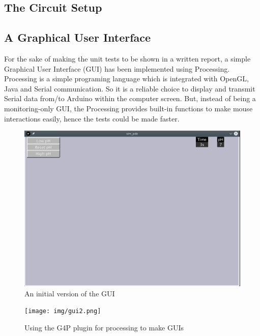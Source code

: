 
\subsection{The Circuit Setup}


\subsection{A Graphical User Interface}

For the sake of making the unit tests to be shown in a written report,
a simple Graphical User Interface (GUI) has been implemented using Processing.
Processing is a simple programing language which is integrated with OpenGL,
Java and Serial communication.
So it is a reliable choice to display and transmit Serial data from/to Arduino within the computer screen.
But,
instead of being a monitoring-only GUI,
the Processing provides built-in functions to make mouse interactions easily,
hence the tests could be made faster.

\begin{figure}[h]
    \centering
    \includegraphics[width=.7\textwidth]{img/gui1.png}
    \caption{An initial version of the GUI}
    \label{fig:gui}
\end{figure}

\begin{figure}[h]
    \centering
    \texttt{[image: img/gui2.png]}
    \caption{Using the G4P plugin for processing to make GUIs}
    \label{fig:g4p}
\end{figure}
